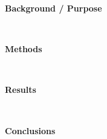 \documentclass[11pt]{article}
\title{\vspace{-1cm}%
}
\affil[]{}
\date{}
\begin{document}
\maketitle
\thispagestyle{fancyfirst}
{\bfseries\large Background / Purpose}
\begin{lstlisting}[mathescape]
%purpose%
\end{lstlisting}
\hfill \\
{\bfseries\large Methods}
\begin{lstlisting}[mathescape]
%methods%
\end{lstlisting}
\hfill \\
{\bfseries\large Results}
\begin{lstlisting}[mathescape]
%results%
\end{lstlisting}
\hfill \\
{\bfseries\large Conclusions}
\begin{lstlisting}[mathescape]
%conclusions%
\end{lstlisting}
\hfill \\
\end{document}
